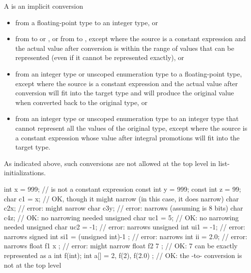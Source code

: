 \pnum
A
%
%
 is an implicit conversion
\begin{itemize}
\item from a floating-point type to an integer type, or

\item from  to  or , or from
 to , except where the source is a constant expression and
the actual value after conversion
is within the range of values that can be represented (even if it cannot be represented exactly),
or

\item from an integer type or unscoped enumeration type to a floating-point type, except
where the source is a constant expression and the actual value after conversion will fit
into the target type and will produce the original value when converted back to the
original type, or

\item from an integer type or unscoped enumeration type to an integer type that cannot
represent all the values of the original type, except where the source is a constant
expression whose value after integral promotions will fit into the target type.
\end{itemize}

\begin{note}
As indicated above, such conversions are not allowed at the top level in
list-initializations.
\end{note}
\begin{example}
\begin{codeblock}
int x = 999;                    //  is not a constant expression
const int y = 999;
const int z = 99;
char c1 = x;                    // OK, though it might narrow (in this case, it does narrow)
char c2{x};                     // error: might narrow
char c3{y};                     // error: narrows (assuming  is 8 bits)
char c4{z};                     // OK: no narrowing needed
unsigned char uc1 = {5};        // OK: no narrowing needed
unsigned char uc2 = {-1};       // error: narrows
unsigned int ui1 = {-1};        // error: narrows
signed int si1 =
  { (unsigned int)-1 };         // error: narrows
int ii = {2.0};                 // error: narrows
float f1 { x };                 // error: might narrow
float f2 { 7 };                 // OK: 7 can be exactly represented as a 
int f(int);
int a[] = { 2, f(2), f(2.0) };  // OK: the -to- conversion is not at the top level
\end{codeblock}
\end{example}
%
%

